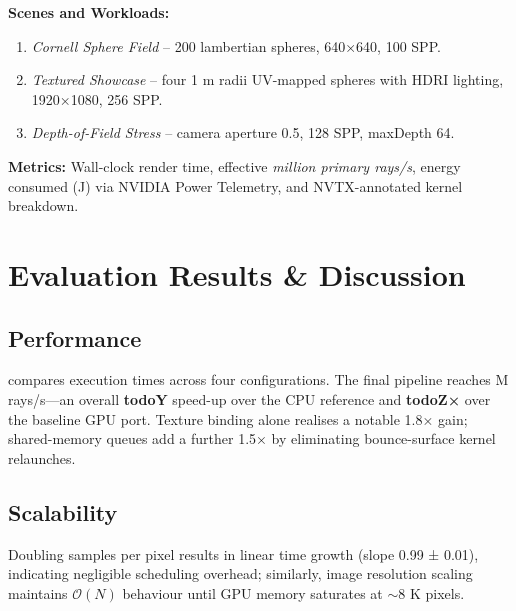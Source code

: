 \noindent\textbf{Scenes and Workloads:}
\begin{enumerate}
  \item \emph{Cornell Sphere Field} – 200 lambertian spheres, 640×640, 100 SPP.
  \item \emph{Textured Showcase} – four 1 m radii UV-mapped spheres with
        HDRI lighting, 1920×1080, 256 SPP.
  \item \emph{Depth-of-Field Stress} – camera aperture 0.5, 128 SPP,
        maxDepth 64.
\end{enumerate}

\noindent\textbf{Metrics:}
Wall-clock render time, effective
\emph{million primary rays/s}, energy consumed (J) via NVIDIA Power
Telemetry, and NVTX-annotated kernel breakdown.

\section{Evaluation Results \& Discussion}
\subsection{Performance}
compares execution times across four
configurations.  The final pipeline reaches
 M rays/s—an overall \textbf{
  todoY  } speed-up over the CPU
reference and \textbf{todo{Z}×} over the baseline GPU port.  Texture
binding alone realises a notable 1.8× gain; shared-memory queues add a
further 1.5× by eliminating bounce-surface kernel relaunches.


\subsection{Scalability}
Doubling samples per pixel results in linear time growth (slope
0.99 ± 0.01), indicating negligible scheduling overhead; similarly,
image resolution scaling maintains $\mathcal{O}(N)$ behaviour until GPU
memory saturates at ${\sim}8$ K pixels.

